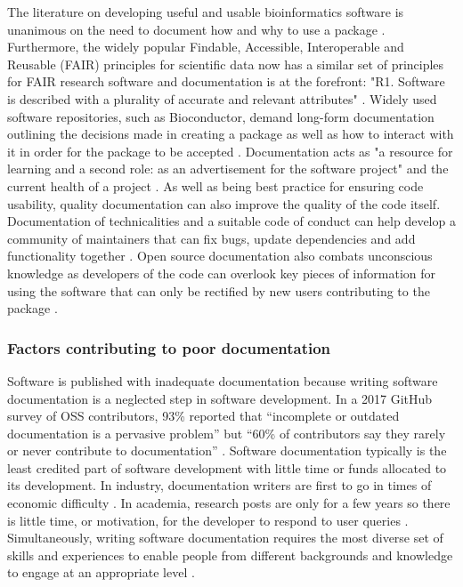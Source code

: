 \documentclass[../main.tex]{subfiles}
\begin{document}
The literature on developing useful and usable bioinformatics software is unanimous on the need to document how and why to use a package \parencite{Wilson2017,Taschuk2017,Leprevost2014}.
Furthermore, the widely popular Findable, Accessible, Interoperable and Reusable (FAIR) principles for scientific data now has a similar set of principles for FAIR research software and documentation is at the forefront: "R1. Software is described with a plurality of accurate and relevant attributes" \parencite{Barker2022}.
Widely used software repositories, such as Bioconductor, demand long-form documentation outlining the decisions made in creating a package as well as how to interact with it in order for the package to be accepted \parencite{Gentleman2004}.
Documentation acts as "a resource for learning and a second role: as an advertisement for the software project" and the current health of a project \parencite{Geiger2018}.
As well as being best practice for ensuring code usability, quality documentation can also improve the quality of the code itself.
Documentation of technicalities and a suitable code of conduct can help develop a community of maintainers that can fix bugs, update dependencies and add functionality together \parencite{Community2022}.
Open source documentation also combats unconscious knowledge as developers of the code can overlook key pieces of information for using the software that can only be rectified by new users contributing to the package \parencite{Hermann2022}.


\subsubsection{Factors contributing to poor documentation}

Software is published with inadequate documentation because writing software documentation is a neglected step in software development.
In a 2017 GitHub survey of OSS contributors, 93\% reported that “incomplete or outdated documentation is a pervasive problem” but “60\% of contributors say they rarely or never contribute to documentation” \parencite{Geiger2017}.
Software documentation typically is the least credited part of software development with little time or funds allocated to its development.
In industry, documentation writers are first to go in times of economic difficulty \parencite{Forward2002}.
In academia, research posts are only for a few years so there is little time, or motivation, for the developer to respond to user queries \parencite{Hermann2022}.
Simultaneously, writing software documentation requires the most diverse set of skills and experiences to enable people from different backgrounds and knowledge to engage at an appropriate level \parencite{Geiger2018}.
\end{document}
